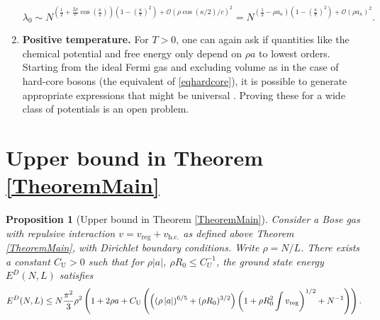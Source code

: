 \documentclass[a4paper,11pt]{article}
\newcommand{\abs}[1]{\left\lvert #1 \right\rvert}
\newtheorem{proposition}[theorem]{Proposition}
\numberwithin{equation}{section}
\begin{document}
\begin{enumerate}
\begin{equation}
\lambda_0\sim N^{\left(\frac12+\frac{2\rho}{c}\cos\left(\frac{\kappa}{2}\right)\right)\left(1-\left(\frac{\kappa}{\pi}\right)^2\right)+\mathcal{O}(\rho \cos(\kappa/2)/c)^2}=N^{\left(\frac12-\rho a_\kappa\right)\left(1-\left(\frac{\kappa}{\pi}\right)^2\right)+\mathcal{O}(\rho a_\kappa)^2}.
\end{equation}
\item \textbf{Positive temperature.} For $T>0$, one can again ask if quantities like the chemical potential and free energy only depend on $\rho a$ to lowest orders. Starting from the ideal Fermi gas and excluding volume as in the case of hard-core bosons (the equivalent of \eqref{eqhardcore}), it is possible to generate appropriate expressions that might be universal \cite{de2019beyond}. Proving these for a wide class of potentials is an open problem. 
\end{enumerate}
	


\section{Upper bound in Theorem \ref{TheoremMain}}	
\label{SecUpperbound} 
	\begin{proposition}[Upper bound in Theorem \ref{TheoremMain}]
		\label{PropositionUpperBound}
		Consider a Bose gas with repulsive interaction  $v=v_{\text{reg}}+v_{\text{h.c.}}$ as defined above Theorem \ref{TheoremMain}, with Dirichlet boundary conditions. Write $\rho=N/L$. There exists a constant $C_\text{U}>0$ such that for $\rho|a|$, $\rho R_0\leq C_U^{-1}$, the ground state energy $E^D(N,L)$ satisfies
		\begin{equation}
		\label{equpper}
		E^D(N,L)\leq N\frac{\pi^2}{3}\rho^2\left(1+2\rho a + C_\text{U}\left(\left((\rho\abs{a})^{6/5}+(\rho R_0)^{3/2}\right)\left(1+\rho R_0^2 \int v_{\textnormal{reg}}\right)^{1/2}+N^{-1}\right)\right).
		\end{equation}
	\end{proposition}
\end{document}
